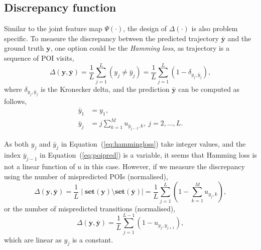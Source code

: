 {\subsection{Discrepancy function}
\label{sec:lossfunc}

Similar to the joint feature map $\Psi(\cdot)$, the design of $\Delta(\cdot)$ is also problem specific.
To measure the discrepancy between the predicted trajectory $\bar{\mathbf{y}}$ and the ground truth $\mathbf{y}$, 
one option could be the \emph{Hamming loss}, as trajectory is a sequence of POI visits, 
\begin{equation}
\label{eq:hammingloss}
\Delta(\mathbf{y}, \bar{\mathbf{y}}) = \frac{1}{L} \sum_{j=1}^L (y_j \neq \bar{y}_j) = \frac{1}{L} \sum_{j=1}^L \left(1 - \delta_{y_j, \bar{y}_j} \right),
\end{equation}
where $\delta_{y_j, \bar{y}_j}$ is the Kronecker delta,
and the prediction $\bar{\mathbf{y}}$ can be computed as follows,
\begin{align}
\bar{y}_1 &= y_1, \\
\bar{y}_j &= j \sum_{k=1}^M u_{\bar{y}_{j-1}, k},~ j=2,\dots,L.  \label{eq:poipred}
\end{align}

As both $y_j$ and $\bar{y}_j$ in Equation~(\ref{eq:hammingloss}) take integer values,
and the index $\bar{y}_{j-1}$ in Equation~(\ref{eq:poipred}) is a variable,
it seems that Hamming loss is not a linear function of $u$ in this case.
However, if we measure the discrepancy using the number of mispredicted POIs (normalised),
\begin{equation}
\Delta(\mathbf{y}, \bar{\mathbf{y}}) = \frac{1}{L} \mid \textbf{set}(\mathbf{y}) \setminus \textbf{set}(\bar{\mathbf{y}}) \mid 
                                     = \frac{1}{L} \sum_{j=1}^L \left( 1 - \sum_{k=1}^M u_{y_j, k} \right),
\end{equation}
or the number of mispredicted transitions (normalised),
\begin{equation}
\Delta(\mathbf{y}, \bar{\mathbf{y}}) = \frac{1}{L} \sum_{j=1}^{L-1} \left( 1 - u_{y_j, y_{j+1}} \right),
\end{equation}
which are linear as $y_j$ is a constant.



}
